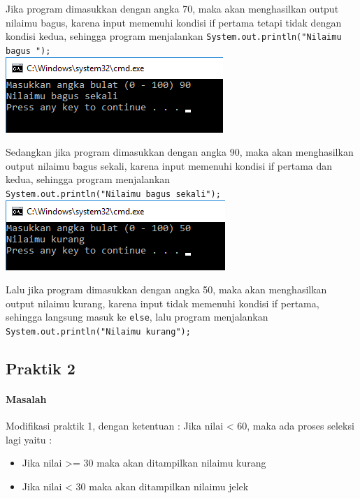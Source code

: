 \documentclass[a4paper,12pt]{article}
\begin{document}
Jika program dimasukkan dengan angka 70, maka akan menghasilkan output nilaimu bagus, karena input memenuhi kondisi if pertama tetapi tidak dengan kondisi kedua, sehingga program menjalankan \texttt{System.out.println("Nilaimu bagus ");}\\

\includegraphics[scale=0.6]{image--002}

Sedangkan jika program dimasukkan dengan angka 90, maka akan menghasilkan output nilaimu bagus sekali, karena input memenuhi kondisi if pertama dan kedua, sehingga program menjalankan\\ \texttt{System.out.println("Nilaimu bagus sekali");}\\

\includegraphics[scale=0.6]{image--003}

Lalu jika program dimasukkan dengan angka 50, maka akan menghasilkan output nilaimu kurang, karena input tidak memenuhi kondisi if pertama, sehingga langsung masuk ke \texttt{else}, lalu program menjalankan\\ \texttt{System.out.println("Nilaimu kurang");}

\subsection{Praktik 2}
\paragraph{Masalah\\}
Modifikasi praktik 1, dengan ketentuan :
Jika nilai < 60, maka ada proses seleksi lagi yaitu :
\begin{itemize}
	\item Jika nilai >= 30 maka akan ditampilkan nilaimu kurang
	\item Jika nilai < 30 maka akan ditampilkan nilaimu jelek
\end{itemize}
\end{document}
